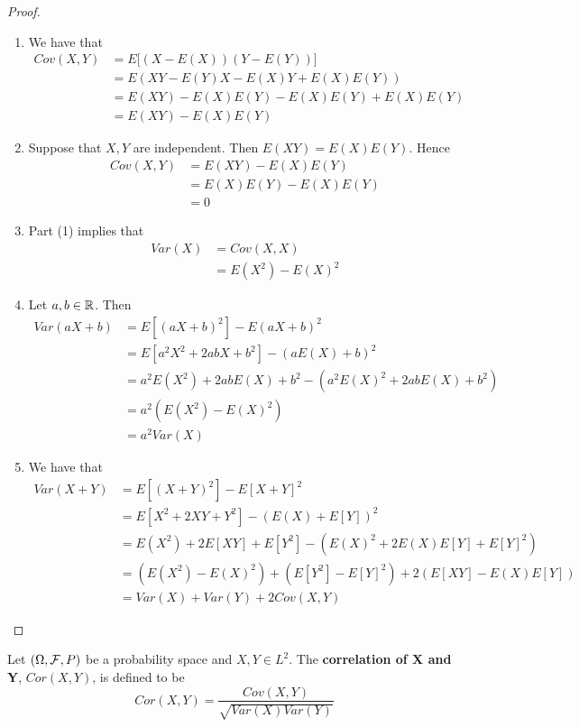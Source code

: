 \documentclass{book}
\begin{document}
	\begin{proof}\
		\begin{enumerate}
			\item We have that
			\begin{align*}
				Cov(X,Y) 
				&= E\bigg[ (X-E(X))(Y-E(Y)) \bigg] \\
				&= E(XY -E(Y)X - E(X)Y + E(X)E(Y)) \\
				&= E(XY) - E(X)E(Y) - E(X)E(Y) + E(X)E(Y) \\ 
				&= E(XY) - E(X)E(Y)
			\end{align*}
			\item Suppose that $X,Y$ are independent. Then $E(XY) = E(X)E(Y)$. Hence 
			\begin{align*}
				Cov(X,Y) 
				&= E(XY) - E(X)E(Y) \\
				&= E(X)E(Y) - E(X)E(Y) \\
				&= 0
			\end{align*}
			\item Part (1) implies that 
			\begin{align*}
				Var(X) 
				&= Cov(X, X) \\
				&= E(X^2) -E(X)^2
			\end{align*}
			\item Let $a,b \in \mathbb{R}$. Then
			\begin{align*}
				Var(aX+b)
				&= E[(aX+b)^2] - E(aX+b)^2 \\
				&= E[a^2X^2 + 2abX +b^2] - (aE(X)+b)^2 \\
				&= a^2E(X^2)+2abE(X) + b^2 - (a^2E(X)^2 +2abE(X)+b^2) \\
				&= a^2(E(X^2)-E(X)^2) \\
				&= a^2Var(X)
			\end{align*} 
			\item We have that 
			\begin{align*}
				Var(X+Y) 
				&= E[(X+Y)^2] - E[X+Y]^2 \\
				&= E[X^2 +2XY + Y^2] -(E(X)+E[Y])^2 \\
				&= E(X^2) + 2E[XY] + E[Y^2] - (E(X)^2 + 2E(X)E[Y] + E[Y]^2) \\
				&= (E(X^2) - E(X)^2) + (E[Y^2]- E[Y]^2) + 2(E[XY] - E(X)E[Y]) \\
				&= Var(X) + Var(Y) + 2Cov(X,Y)
			\end{align*}
		\end{enumerate}
	\end{proof}
	
	\begin{defn}
		Let $(\Omega, \mathcal{F}, P)$ be a probability space and $X,Y \in L^2$. The \textbf{correlation of X and Y}, $Cor(X,Y)$, is defined to be $$Cor(X,Y) = \frac{Cov(X,Y)}{\sqrt{Var(X)Var(Y)}}$$
	\end{defn}
	
\end{document}

